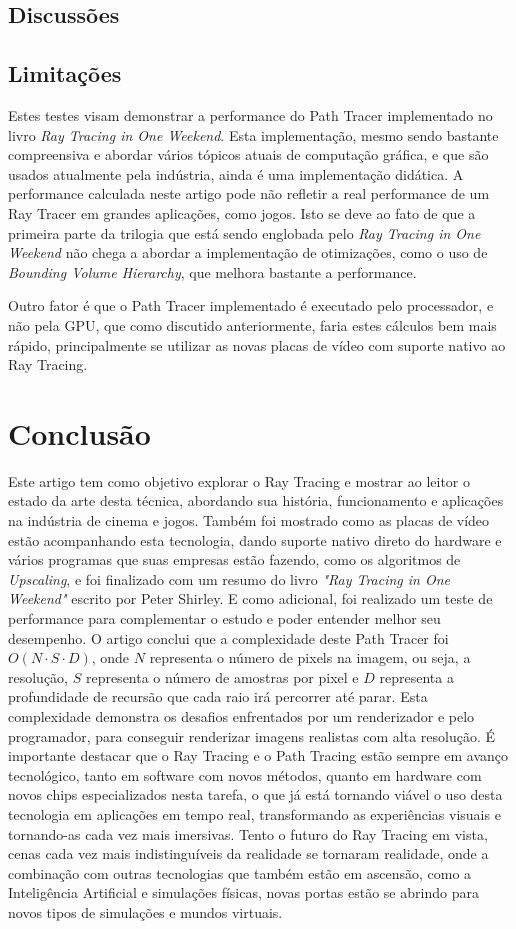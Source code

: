 \documentclass[journal]{IEEEtran}
\begin{document}
\subsection*{Discussões}

\subsection*{Limitações}
Estes testes visam demonstrar a performance do Path Tracer implementado no livro \emph{Ray Tracing in One Weekend}.
Esta implementação, mesmo sendo bastante compreensiva e abordar vários tópicos atuais de computação gráfica, e que
são usados atualmente pela indústria, ainda é uma implementação didática. A performance calculada neste artigo
pode não refletir a real performance de um Ray Tracer em grandes aplicações, como jogos. Isto se deve ao fato de que
a primeira parte da trilogia que está sendo englobada pelo \emph{Ray Tracing in One Weekend} não chega a abordar
a implementação de otimizações, como o uso de \emph{Bounding Volume Hierarchy}, que melhora bastante a performance.

Outro fator é que o Path Tracer implementado é executado pelo processador, e não pela GPU, que como discutido anteriormente,
faria estes cálculos bem mais rápido, principalmente se utilizar as novas placas de vídeo com suporte nativo
ao Ray Tracing.

\section{Conclusão}
Este artigo tem como objetivo explorar o Ray Tracing e mostrar ao leitor o estado da arte desta técnica, abordando
sua história, funcionamento e aplicações na indústria de cinema e jogos. Também foi mostrado como as placas de vídeo
estão acompanhando esta tecnologia, dando suporte nativo direto do hardware e vários programas que suas empresas
estão fazendo, como os algoritmos de \emph{Upscaling}, e foi finalizado com um resumo do livro \emph{"Ray Tracing in
One Weekend"} escrito por Peter Shirley. E como adicional, foi realizado um teste de performance para complementar
o estudo e poder entender melhor seu desempenho. O artigo conclui que a complexidade deste Path Tracer foi 
$O(N \cdot S \cdot D)$, onde $N$ representa o número de pixels na imagem, ou seja, a resolução, $S$ representa o 
número de amostras por pixel e $D$ representa a profundidade de recursão que cada raio irá percorrer até parar.
Esta complexidade demonstra os desafios enfrentados por um renderizador e pelo programador, para conseguir
renderizar imagens realistas com alta resolução. É importante destacar que o Ray Tracing e o Path Tracing estão
sempre em avanço tecnológico, tanto em software com novos métodos, quanto em hardware com novos chips especializados
nesta tarefa, o que já está tornando viável o uso desta tecnologia em aplicações em tempo real, transformando
as experiências visuais e tornando-as cada vez mais imersivas. Tento o futuro do Ray Tracing em vista, cenas cada
vez mais indistinguíveis da realidade se tornaram realidade, onde a combinação com outras tecnologias que também
estão em ascensão, como a Inteligência Artificial e simulações físicas, novas portas estão se abrindo para
novos tipos de simulações e mundos virtuais.
\end{document}
